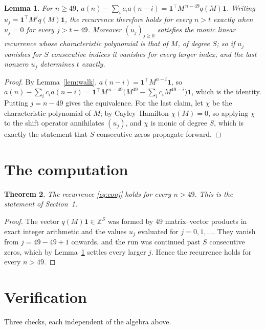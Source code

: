 \documentclass[11pt,a4paper]{article}
\theoremstyle{plain}
\newtheorem{theorem}{Theorem}
\newtheorem{lemma}[theorem]{Lemma}
\theoremstyle{definition}
\begin{document}
\begin{lemma}\label{lem:crit}
For $n\ge49$,
$a(n)-\sum_i c_i a(n-i)=\mathbf{1}^{\!\top}M^{\,n-49}q(M)\mathbf{1}$. Writing
$u_j=\mathbf{1}^{\!\top}M^{j}q(M)\mathbf{1}$, the recurrence therefore holds for every
$n>t$ exactly when $u_j=0$ for every $j>t-49$. Moreover $(u_j)_{j\ge0}$ satisfies the
monic linear recurrence whose characteristic polynomial is that of $M$, of degree $S$; so
if $u_j$ vanishes for $S$ consecutive indices it vanishes for every larger index, and the
last nonzero $u_j$ determines $t$ exactly.
\end{lemma}

\begin{proof}
By Lemma~\ref{lem:walk}, $a(n-i)=\mathbf{1}^{\!\top}M^{n-i}\mathbf{1}$, so
$a(n)-\sum_i c_i a(n-i)
=\mathbf{1}^{\!\top}M^{\,n-49}\bigl(M^{49}-\sum_i c_i M^{49-i}\bigr)
\mathbf{1}$, which is the identity. Putting $j=n-49$ gives the equivalence. For the
last claim, let $\chi$ be the characteristic polynomial of $M$; by Cayley--Hamilton
$\chi(M)=0$, so applying $\chi$ to the shift operator annihilates $(u_j)$, and $\chi$ is
monic of degree $S$, which is exactly the statement that $S$ consecutive zeros propagate
forward.
\end{proof}

\section{The computation}

\begin{theorem}
The recurrence \eqref{eq:conj} holds for every $n>49$. This is the statement of
Section~1.
\end{theorem}

\begin{proof}
The vector $q(M)\mathbf{1}\in\mathbb{Z}^{S}$ was formed by $49$ matrix--vector
products in exact integer arithmetic and the values $u_j$ evaluated for
$j=0,1,\dots$. They vanish from $j=49-49+1$ onwards, and the run was continued past
$S$ consecutive zeros, which by Lemma~\ref{lem:crit} settles every larger $j$. Hence the
recurrence holds for every $n>49$.
\end{proof}

\section{Verification}

Three checks, each independent of the algebra above.
\end{document}
